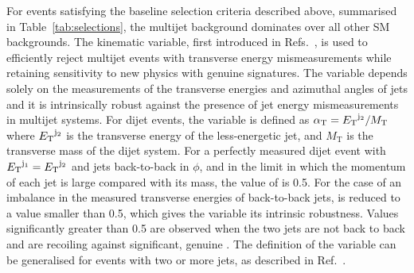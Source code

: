 
For events satisfying the baseline selection criteria described above,
summarised in Table~\ref{tab:selections}, the multijet background
dominates over all other SM backgrounds. The \alphat kinematic
variable, first introduced in Refs.~\cite{Randall:2008rw, RA1Paper},
is used to efficiently reject multijet events with transverse energy
mismeasurements while retaining sensitivity to new physics with
genuine \ptvecmiss signatures. The variable \alphat depends solely on the
measurements of the transverse energies and azimuthal angles of jets
and it is intrinsically robust against the presence of jet energy
mismeasurements in multijet systems. For dijet events, the \alphat
variable is defined as $\alpha_{\text{T}} = {E_{\text T}}^{\rm j_2}/M_\text{T}$ where
${E_{\text T}}^{\rm j_2}$ is the transverse energy of the less-energetic jet,
and $M_\text{T}$ is the transverse mass of the dijet system.  For a
perfectly measured dijet event with ${E_{\text T}}^{\mathrm{j}_1} =
{E_{\text T}}^{\mathrm{j}_2}$ and jets back-to-back in $\phi$, and in the limit
in which the momentum of each jet is large compared with its mass, the
value of \alphat is 0.5. For the case of an imbalance in the measured
transverse energies of back-to-back jets, \alphat is reduced to a
value smaller than 0.5, which gives the variable its intrinsic
robustness. Values significantly greater than 0.5 are observed when
the two jets are not back to back and are recoiling against
significant, genuine \ptvecmiss. The definition of the \alphat variable
can be generalised for events with two or more jets, as described in
Ref.~\cite{RA1Paper2012}.

